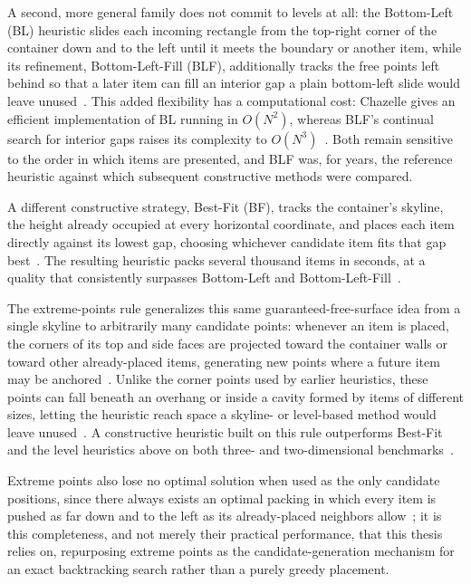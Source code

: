 A second, more general family does not commit to levels at all: the Bottom-Left (BL) heuristic slides each incoming rectangle from the top-right corner of the container down and to the left until it meets the boundary or another item, while its refinement, Bottom-Left-Fill (BLF), additionally tracks the free points left behind so that a later item can fill an interior gap a plain bottom-left slide would leave unused~\cite{chazelle-bl}. This added flexibility has a computational cost: Chazelle gives an efficient implementation of BL running in $O(N^2)$, whereas BLF's continual search for interior gaps raises its complexity to $O(N^3)$~\cite{chazelle-bl}. Both remain sensitive to the order in which items are presented, and BLF was, for years, the reference heuristic against which subsequent constructive methods were compared.

A different constructive strategy, Best-Fit (BF), tracks the container's skyline, the height already occupied at every horizontal coordinate, and places each item directly against its lowest gap, choosing whichever candidate item fits that gap best~\cite{burke-bf}. The resulting heuristic packs several thousand items in seconds, at a quality that consistently surpasses Bottom-Left and Bottom-Left-Fill~\cite{burke-bf}.

The extreme-points rule generalizes this same guaranteed-free-surface idea from a single skyline to arbitrarily many candidate points: whenever an item is placed, the corners of its top and side faces are projected toward the container walls or toward other already-placed items, generating new points where a future item may be anchored~\cite{crainic-extreme-points}. Unlike the corner points used by earlier heuristics, these points can fall beneath an overhang or inside a cavity formed by items of different sizes, letting the heuristic reach space a skyline- or level-based method would leave unused~\cite{crainic-extreme-points}. A constructive heuristic built on this rule outperforms Best-Fit and the level heuristics above on both three- and two-dimensional benchmarks~\cite{crainic-extreme-points}. 

Extreme points also lose no optimal solution when used as the only candidate positions, since there always exists an optimal packing in which every item is pushed as far down and to the left as its already-placed neighbors allow~\cite{lodi-packing-survey}; it is this completeness, and not merely their practical performance, that this thesis relies on, repurposing extreme points as the candidate-generation mechanism for an exact backtracking search rather than a purely greedy placement.


